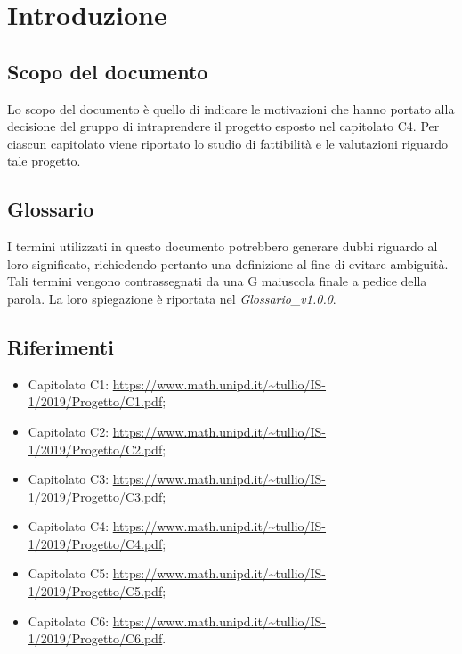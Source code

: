\section{Introduzione}

\subsection{Scopo del documento}
Lo scopo del documento è quello di indicare le motivazioni che hanno portato alla decisione del gruppo di intraprendere il progetto esposto nel capitolato C4. Per ciascun capitolato viene riportato lo studio di fattibilità e le valutazioni riguardo tale progetto.

\subsection{Glossario}
I termini utilizzati in questo documento potrebbero generare dubbi riguardo al loro significato, richiedendo pertanto una definizione al fine di evitare ambiguità. Tali termini vengono contrassegnati da una G maiuscola finale a pedice della parola. La loro spiegazione è riportata nel \textit{Glossario\_v1.0.0}.

\subsection{Riferimenti}
\begin{itemize}
\item Capitolato C1: \url{https://www.math.unipd.it/~tullio/IS-1/2019/Progetto/C1.pdf};
\item Capitolato C2: \url{https://www.math.unipd.it/~tullio/IS-1/2019/Progetto/C2.pdf};
\item Capitolato C3: \url{https://www.math.unipd.it/~tullio/IS-1/2019/Progetto/C3.pdf};
\item Capitolato C4: \url{https://www.math.unipd.it/~tullio/IS-1/2019/Progetto/C4.pdf};
\item Capitolato C5: \url{https://www.math.unipd.it/~tullio/IS-1/2019/Progetto/C5.pdf};
\item Capitolato C6: \url{https://www.math.unipd.it/~tullio/IS-1/2019/Progetto/C6.pdf}.
\end{itemize}